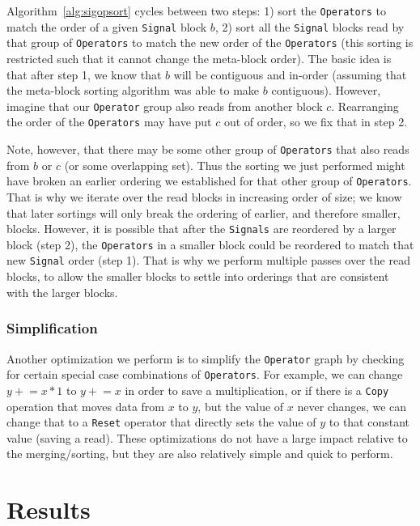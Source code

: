 \documentclass{article}
\begin{document}
Algorithm~\ref{alg:sigopsort} cycles between two steps: 1) sort the \texttt{Operators} to match the order of a given \texttt{Signal} block $b$, 2) sort all the \texttt{Signal} blocks read by that group of \texttt{Operators} to match the new order of the \texttt{Operators} (this sorting is restricted such that it cannot change the meta-block order).  The basic idea is that after step 1, we know that $b$ will be contiguous and in-order (assuming that the meta-block sorting algorithm was able to make $b$ contiguous).  However, imagine that our \texttt{Operator} group also reads from another block $c$.  Rearranging the order of the \texttt{Operators} may have put $c$ out of order, so we fix that in step 2.  

Note, however, that there may be some other group of \texttt{Operators} that also reads from $b$ or $c$ (or some overlapping set).  Thus the sorting we just performed might have broken an earlier ordering we established for that other group of \texttt{Operators}.  That is why we iterate over the read blocks in increasing order of size; we know that later sortings will only break the ordering of earlier, and therefore smaller, blocks.  However, it is possible that after the \texttt{Signals} are reordered by a larger block (step 2), the \texttt{Operators} in a smaller block could be reordered to match that new \texttt{Signal} order (step 1).  That is why we perform multiple passes over the read blocks, to allow the smaller blocks to settle into orderings that are consistent with the larger blocks.

\subsubsection{Simplification}

Another optimization we perform is to simplify the \texttt{Operator} graph by checking for certain special case combinations of \texttt{Operators}.  For example, we can change $y\mathrel{+}=x*1$ to $y\mathrel{+}=x$ in order to save a multiplication, or if there is a \texttt{Copy} operation that moves data from $x$ to $y$, but the value of $x$ never changes, we can change that to a \texttt{Reset} operator that directly sets the value of $y$ to that constant value (saving a read).  These optimizations do not have a large impact relative to the merging/sorting, but they are also relatively simple and quick to perform.

\section{Results}
\end{document}
